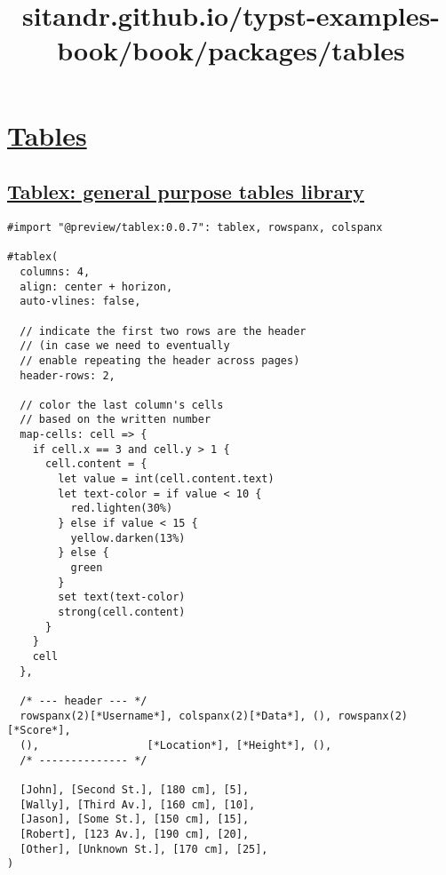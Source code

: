 \title{sitandr.github.io/typst-examples-book/book/packages/tables}

\section{\texorpdfstring{\hyperref[tables]{Tables}}{Tables}}\label{tables}

\subsection{\texorpdfstring{\hyperref[tablex-general-purpose-tables-library]{Tablex:
general purpose tables
library}}{Tablex: general purpose tables library}}\label{tablex-general-purpose-tables-library}

\begin{verbatim}
#import "@preview/tablex:0.0.7": tablex, rowspanx, colspanx

#tablex(
  columns: 4,
  align: center + horizon,
  auto-vlines: false,

  // indicate the first two rows are the header
  // (in case we need to eventually
  // enable repeating the header across pages)
  header-rows: 2,

  // color the last column's cells
  // based on the written number
  map-cells: cell => {
    if cell.x == 3 and cell.y > 1 {
      cell.content = {
        let value = int(cell.content.text)
        let text-color = if value < 10 {
          red.lighten(30%)
        } else if value < 15 {
          yellow.darken(13%)
        } else {
          green
        }
        set text(text-color)
        strong(cell.content)
      }
    }
    cell
  },

  /* --- header --- */
  rowspanx(2)[*Username*], colspanx(2)[*Data*], (), rowspanx(2)[*Score*],
  (),                 [*Location*], [*Height*], (),
  /* -------------- */

  [John], [Second St.], [180 cm], [5],
  [Wally], [Third Av.], [160 cm], [10],
  [Jason], [Some St.], [150 cm], [15],
  [Robert], [123 Av.], [190 cm], [20],
  [Other], [Unknown St.], [170 cm], [25],
)
\end{verbatim}

\pandocbounded{}

